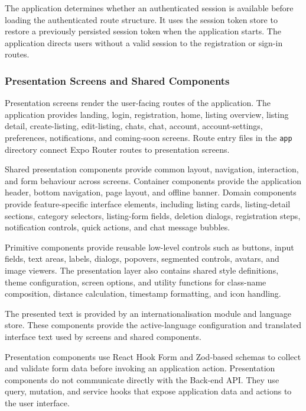 The application determines whether an authenticated session is available before loading the authenticated route structure.
It uses the session token store to restore a previously persisted session token when the application starts.
The application directs users without a valid session to the registration or sign-in routes.

\subsubsection{Presentation Screens and Shared Components}
\label{sec:c3-presentation}

Presentation screens render the user-facing routes of the application.
The application provides landing, login, registration, home, listing overview, listing detail, create-listing, edit-listing, chats, chat, account, account-settings, preferences, notifications, and coming-soon screens.
Route entry files in the \texttt{app} directory connect Expo Router routes to presentation screens.

Shared presentation components provide common layout, navigation, interaction, and form behaviour across screens.
Container components provide the application header, bottom navigation, page layout, and offline banner.
Domain components provide feature-specific interface elements, including listing cards, listing-detail sections, category selectors, listing-form fields, deletion dialogs, registration steps, notification controls, quick actions, and chat message bubbles.

Primitive components provide reusable low-level controls such as buttons, input fields, text areas, labels, dialogs, popovers, segmented controls, avatars, and image viewers.
The presentation layer also contains shared style definitions, theme configuration, screen options, and utility functions for class-name composition, distance calculation, timestamp formatting, and icon handling.

The presented text is provided by an internationalisation module and language store.
These components provide the active-language configuration and translated interface text used by screens and shared components.

Presentation components use React Hook Form and Zod-based schemas to collect and validate form data before invoking an application action.
Presentation components do not communicate directly with the \tradesq{} Back-end API.
They use query, mutation, and service hooks that expose application data and actions to the user interface.

